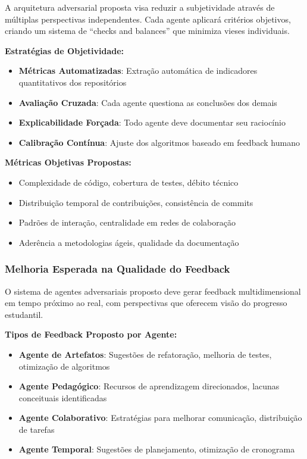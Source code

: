 \documentclass[english, spanish, brazilian]{modelo_dt}
\begin{document}
A arquitetura adversarial proposta visa reduzir a subjetividade através de
múltiplas perspectivas independentes\@. Cada agente aplicará critérios
objetivos, criando um sistema de ``checks and balances'' que minimiza vieses
individuais\@.

\textbf{Estratégias de Objetividade:}
\begin{itemize}
  \item \textbf{Métricas Automatizadas}: Extração automática de indicadores quantitativos dos repositórios
  \item \textbf{Avaliação Cruzada}: Cada agente questiona as conclusões dos demais
  \item \textbf{Explicabilidade Forçada}: Todo agente deve documentar seu raciocínio
  \item \textbf{Calibração Contínua}: Ajuste dos algoritmos baseado em feedback humano
\end{itemize}

\textbf{Métricas Objetivas Propostas:}
\begin{itemize}
  \item Complexidade de código, cobertura de testes, débito técnico
  \item Distribuição temporal de contribuições, consistência de commits
  \item Padrões de interação, centralidade em redes de colaboração
  \item Aderência a metodologias ágeis, qualidade da documentação
\end{itemize}

\subsubsection{Melhoria Esperada na Qualidade do Feedback}

O sistema de agentes adversariais proposto deve gerar feedback multidimensional
em tempo próximo ao real, com perspectivas que oferecem visão do progresso
estudantil.

\textbf{Tipos de Feedback Proposto por Agente:}
\begin{itemize}
  \item \textbf{Agente de Artefatos}: Sugestões de refatoração, melhoria de testes, otimização de algoritmos
  \item \textbf{Agente Pedagógico}: Recursos de aprendizagem direcionados, lacunas conceituais identificadas
  \item \textbf{Agente Colaborativo}: Estratégias para melhorar comunicação, distribuição de tarefas
  \item \textbf{Agente Temporal}: Sugestões de planejamento, otimização de cronograma
\end{itemize}
\end{document}
